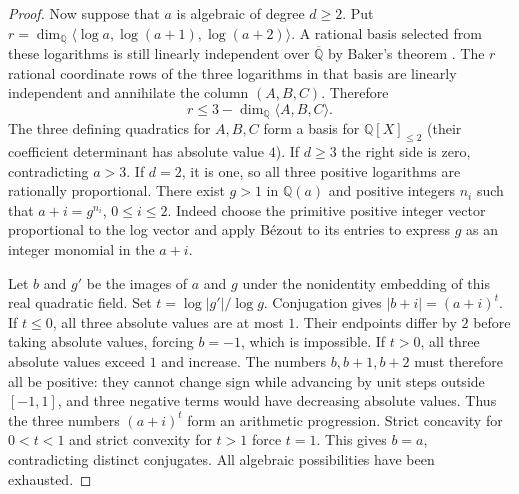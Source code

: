 \documentclass[11pt,a4paper]{article}
\theoremstyle{definition}\newtheorem{definition}[theorem]{Definition}\newtheorem{example}[theorem]{Example}
\theoremstyle{remark}\newtheorem{remark}[theorem]{Remark}
\newcommand{\Q}{\mathbb Q}\newcommand{\Z}{\mathbb Z}\newcommand{\R}{\mathbb R}\newcommand{\N}{\mathbb N}
\begin{document}
\begin{proof}
Now suppose that $a$ is algebraic of degree $d\ge2$. Put $r=\dim_{\Q}\langle\log a,\log(a+1),\log(a+2)\rangle$. A rational basis selected from these logarithms is still linearly independent over $\overline{\Q}$ by Baker's theorem \cite{Baker}. The $r$ rational coordinate rows of the three logarithms in that basis are linearly independent and annihilate the column $(A,B,C)$. Therefore
\[
 r\le 3-\dim_{\Q}\langle A,B,C\rangle.
\]
The three defining quadratics for $A,B,C$ form a basis for $\Q[X]_{\le2}$ (their coefficient determinant has absolute value $4$). If $d\ge3$ the right side is zero, contradicting $a>3$. If $d=2$, it is one, so all three positive logarithms are rationally proportional. There exist $g>1$ in $\Q(a)$ and positive integers $n_i$ such that $a+i=g^{n_i}$, $0\le i\le2$. Indeed choose the primitive positive integer vector proportional to the log vector and apply B\'ezout to its entries to express $g$ as an integer monomial in the $a+i$.

Let $b$ and $g'$ be the images of $a$ and $g$ under the nonidentity embedding of this real quadratic field. Set $t=\log|g'|/\log g$. Conjugation gives $|b+i|=(a+i)^t$. If $t\le0$, all three absolute values are at most $1$. Their endpoints differ by $2$ before taking absolute values, forcing $b=-1$, which is impossible. If $t>0$, all three absolute values exceed $1$ and increase. The numbers $b,b+1,b+2$ must therefore all be positive: they cannot change sign while advancing by unit steps outside $[-1,1]$, and three negative terms would have decreasing absolute values. Thus the three numbers $(a+i)^t$ form an arithmetic progression. Strict concavity for $0<t<1$ and strict convexity for $t>1$ force $t=1$. This gives $b=a$, contradicting distinct conjugates. All algebraic possibilities have been exhausted.
\end{proof}
\end{document}
